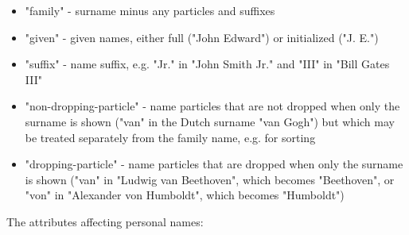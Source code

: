\begin{itemize}
\tightlist
\item
  "family" - surname minus any particles and suffixes
\item
  "given" - given names, either full ("John Edward") or initialized ("J.
  E.")
\item
  "suffix" - name suffix, e.g. "Jr." in "John Smith Jr." and "III" in
  "Bill Gates III"
\item
  "non-dropping-particle" - name particles that are not dropped when
  only the surname is shown ("van" in the Dutch surname "van Gogh") but
  which may be treated separately from the family name, e.g. for sorting
\item
  "dropping-particle" - name particles that are dropped when only the
  surname is shown ("van" in "Ludwig van Beethoven", which becomes
  "Beethoven", or "von" in "Alexander von Humboldt", which becomes
  "Humboldt")
\end{itemize}

The attributes affecting personal names:


